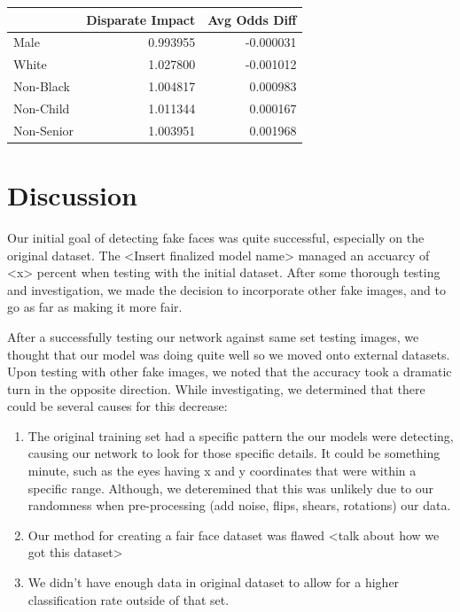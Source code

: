 \documentclass[11pt, letterpaper]{article}
\newenvironment{Figure}
  {\par\medskip\noindent\minipage{\linewidth}}
  {\endminipage\par\medskip}
\providecommand{\tightlist}{%
  \setlength{\itemsep}{0pt}\setlength{\parskip}{0pt}
}
\begin{document}
\begin{multicols}{2}
    \begin{Figure}
      \centering
      \label{fairnessmetrics}
      \begin{tabular}{lrr}
      \toprule
      {} &  Disparate Impact &  Avg Odds Diff \\
      \midrule
      Male       &                0.993955 &                -0.000031 \\
      White      &                1.027800 &                -0.001012 \\
      Non-Black  &                1.004817 &                 0.000983 \\
      Non-Child  &                1.011344 &                 0.000167 \\
      Non-Senior &                1.003951 &                 0.001968 \\
      \bottomrule
      \end{tabular}
      \end{Figure}

  \section{Discussion}
  Our initial goal of detecting fake faces was quite successful, especially on
  the original dataset. The <Insert finalized model name> managed an accuarcy of
  <x> percent when testing with the initial dataset. After some thorough testing
  and investigation, we made the decision to incorporate other fake images, and
  to go as far as making it more fair. 
	
  After a successfully testing our network against same set testing images, we
  thought that our model was doing quite well so we moved onto external
  datasets. Upon testing with other fake images, we noted that the accuracy took
  a dramatic turn in the opposite direction. While investigating, we determined
  that there could be several causes for this decrease:
	
  \begin{enumerate}
    \tightlist
  		\item The original training set had a specific pattern the our models were
  		detecting, causing our network to look for those specific details. It
  		could be something minute, such as the eyes having x and y coordinates
  		that were within a specific range. Although, we deteremined that this was
  		unlikely due to our randomness when pre-processing (add noise, flips,
  		shears, rotations) our data. 
  		\item Our method for creating a fair face dataset was flawed <talk about
  		how we got this dataset>
  		\item We didn't have enough data in original dataset to allow for a higher
  		classification rate outside of that set. 
	\end{enumerate}
	

\end{multicols}
\end{document}
